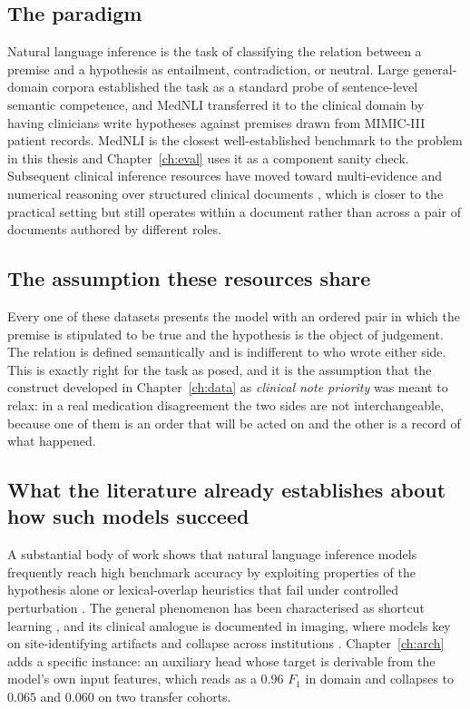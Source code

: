\subsection{The paradigm}

Natural language inference is the task of classifying the relation between a
premise and a hypothesis as entailment, contradiction, or neutral. Large
general-domain corpora \citep{bowman2015snli,williams2018mnli} established the
task as a standard probe of sentence-level semantic competence, and MedNLI
\citep{romanov2018mednli} transferred it to the clinical domain by having
clinicians write hypotheses against premises drawn from MIMIC-III patient
records. MedNLI is the closest well-established benchmark to the problem in this
thesis and Chapter~\ref{ch:eval} uses it as a component sanity check.
Subsequent clinical inference resources have moved toward multi-evidence and
numerical reasoning over structured clinical documents \citep{jullien2023nli4ct},
which is closer to the practical setting but still operates within a document
rather than across a pair of documents authored by different roles.

\subsection{The assumption these resources share}

Every one of these datasets presents the model with an ordered pair in which the
premise is stipulated to be true and the hypothesis is the object of judgement.
The relation is defined semantically and is indifferent to who wrote either
side. This is exactly right for the task as posed, and it is the assumption that
the construct developed in Chapter~\ref{ch:data} as \emph{clinical note
priority} was meant to relax: in a real medication disagreement the two sides
are not interchangeable, because one of them is an order that will be acted on
and the other is a record of what happened.

\subsection{What the literature already establishes about how such models
succeed}

A substantial body of work shows that natural language inference models
frequently reach high benchmark accuracy by exploiting properties of the
hypothesis alone \citep{poliak2018hypothesis,gururangan2018artifacts} or
lexical-overlap heuristics that fail under controlled perturbation
\citep{mccoy2019hans}. The general phenomenon has been characterised as shortcut
learning \citep{geirhos2020shortcut}, and its clinical analogue is documented in
imaging, where models key on site-identifying artifacts and collapse across
institutions \citep{zech2018generalization}. Chapter~\ref{ch:arch} adds a
specific instance: an auxiliary head whose target is derivable from the model's
own input features, which reads as a $0.96$ $F_1$ in domain and collapses to
$0.065$ and $0.060$ on two transfer cohorts.


